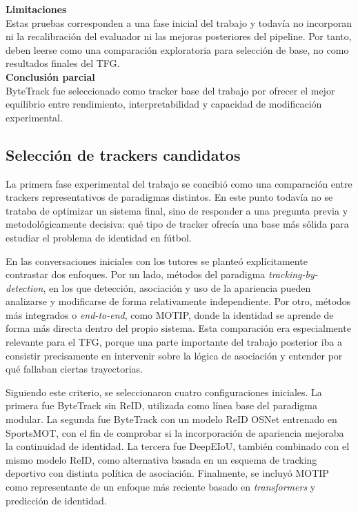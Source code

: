 \documentclass[../MAIN.tex]{subfiles}
\begin{document}
\begin{chaptertemplatebox}
		\textbf{Limitaciones}\\
		Estas pruebas corresponden a una fase inicial del trabajo y todavía no incorporan ni la recalibración del evaluador ni las mejoras posteriores del pipeline. Por tanto, deben leerse como una comparación exploratoria para selección de base, no como resultados finales del TFG.\\[0.5em]
		
		\textbf{Conclusión parcial}\\
		ByteTrack fue seleccionado como tracker base del trabajo por ofrecer el mejor equilibrio entre rendimiento, interpretabilidad y capacidad de modificación experimental.
	\end{chaptertemplatebox}
	
	\subsection{Selección de trackers candidatos}
	
	La primera fase experimental del trabajo se concibió como una comparación entre trackers representativos de paradigmas distintos. En este punto todavía no se trataba de optimizar un sistema final, sino de responder a una pregunta previa y metodológicamente decisiva: qué tipo de tracker ofrecía una base más sólida para estudiar el problema de identidad en fútbol.
	
	En las conversaciones iniciales con los tutores se planteó explícitamente contrastar dos enfoques. Por un lado, métodos del paradigma \textit{tracking-by-detection}, en los que detección, asociación y uso de la apariencia pueden analizarse y modificarse de forma relativamente independiente. Por otro, métodos más integrados o \textit{end-to-end}, como MOTIP, donde la identidad se aprende de forma más directa dentro del propio sistema. Esta comparación era especialmente relevante para el TFG, porque una parte importante del trabajo posterior iba a consistir precisamente en intervenir sobre la lógica de asociación y entender por qué fallaban ciertas trayectorias.
	
	Siguiendo este criterio, se seleccionaron cuatro configuraciones iniciales. La primera fue ByteTrack sin ReID, utilizada como línea base del paradigma modular. La segunda fue ByteTrack con un modelo ReID OSNet entrenado en SportsMOT, con el fin de comprobar si la incorporación de apariencia mejoraba la continuidad de identidad. La tercera fue DeepEIoU, también combinado con el mismo modelo ReID, como alternativa basada en un esquema de tracking deportivo con distinta política de asociación. Finalmente, se incluyó MOTIP como representante de un enfoque más reciente basado en \textit{transformers} y predicción de identidad.
	
\end{document}
